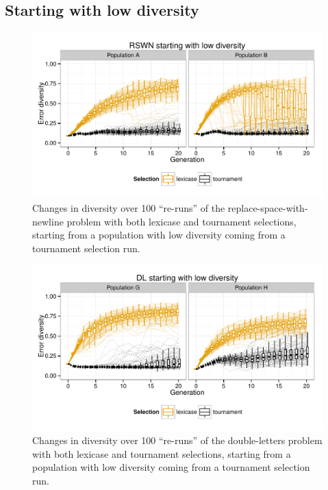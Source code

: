 \documentclass{sig-alternate-05-2015}
\begin{document}
\subsection{Starting with low diversity}
\label{sec:lowDiversityResults}

\begin{figure}
	\includegraphics{../figures/RSWN_low_diversity}
	\vspace{-1 cm}
	\caption{Changes in diversity over 100 ``re-runs'' of the replace-space-with-newline problem with both lexicase and tournament selections, starting from a population with low diversity coming from a tournament selection run.}
	\label{fig:RSWNlowDiversity}
\end{figure}

\begin{figure}
	\includegraphics{../figures/DL_low_diversity}
	\vspace{-1 cm}
	\caption{Changes in diversity over 100 ``re-runs'' of the double-letters problem with both lexicase and tournament selections, starting from a population with low diversity coming from a tournament selection run.}
	\label{fig:DLlowDiversity}
\end{figure}
\end{document}
